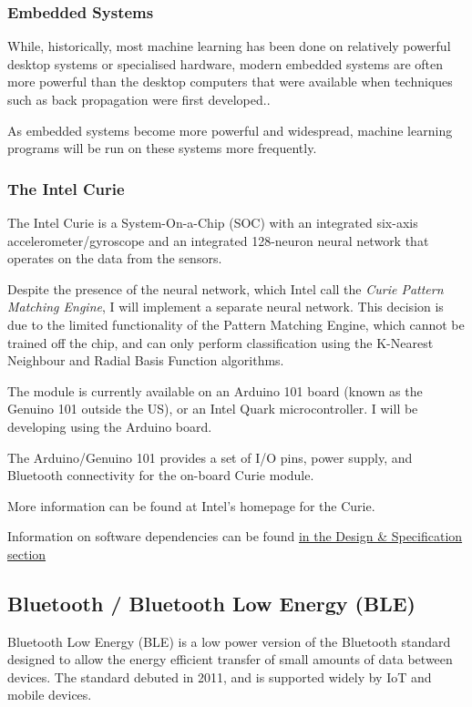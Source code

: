 \documentclass[a4paper]{article}
\begin{document}
\subsubsection{Embedded Systems}

While, historically, most machine learning has been done on relatively powerful desktop systems or specialised hardware, modern embedded systems are often more powerful than the desktop computers that were available when techniques such as back propagation were first developed.\cite{bgref5}. 

As embedded systems become more powerful and widespread, machine learning programs will be run on these systems more frequently.

\subsubsection{The Intel Curie}

The Intel Curie is a System-On-a-Chip (SOC) with an integrated six-axis accelerometer/gyroscope and an integrated 128-neuron neural network that operates on the data from the sensors.

Despite the presence of the neural network, which Intel call the \textit{Curie Pattern Matching Engine}\cite{bgref6}, I will implement a separate neural network. This decision is due to the limited functionality of the Pattern Matching Engine, which cannot be trained off the chip, and can only perform classification using the K-Nearest Neighbour and Radial Basis Function algorithms.

The module is currently available on an Arduino 101 board (known as the Genuino 101 outside the US), or an Intel Quark microcontroller. I will be developing using the Arduino board.

The Arduino/Genuino 101 provides a set of I/O pins, power supply, and Bluetooth connectivity for the on-board Curie module.

More information can be found at Intel's homepage for the Curie\cite{bgref6}.

Information on software dependencies can be found \hyperref[subsec:dn_language]{in the Design \& Specification section}

\subsection{Bluetooth / Bluetooth Low Energy (BLE)}%
\label{subsec:bg_ble}

Bluetooth Low Energy\cite{bgref7} (BLE) is a low power version of the Bluetooth standard designed to allow the energy efficient transfer of small amounts of data between devices. The standard debuted in 2011, and is supported widely by IoT and mobile devices.
\end{document}
